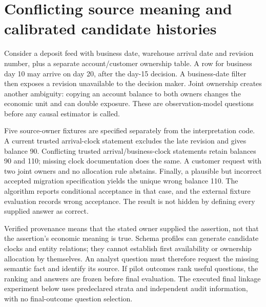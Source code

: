 \section{Conflicting source meaning and calibrated candidate histories}
\label{s6:linked-histories}
Consider a deposit feed with business date, warehouse arrival date and
revision number, plus a separate account/customer ownership table. A row
for business day 10 may arrive on day 20, after the day-15 decision. A
business-date filter then exposes a revision unavailable to the decision
maker. Joint ownership creates another ambiguity: copying an account
balance to both owners changes the economic unit and can double exposure.
These are observation-model questions before any causal estimator is called.

Five source-owner fixtures are specified separately from the interpretation
code. A current trusted arrival-clock statement excludes the late revision
and gives balance 90. Conflicting trusted arrival/business-clock statements
retain balances 90 and 110; missing clock documentation does the same. A
customer request with two joint owners and no allocation rule abstains.
Finally, a plausible but incorrect accepted migration specification yields
the unique wrong balance 110. The algorithm reports conditional acceptance
in that case, and the external fixture evaluation records wrong acceptance.
The result is not hidden by defining every supplied answer as correct.

Verified provenance means that the stated owner supplied the assertion, not
that the assertion's economic meaning is true. Schema profiles can generate
candidate clocks and entity relations; they cannot establish first
availability or ownership allocation by themselves. An analyst question
must therefore request the missing semantic fact and identify its source.
If pilot outcomes rank useful questions, the ranking and answers are frozen
before final evaluation. The executed final linkage experiment below uses
predeclared strata and independent audit information, with no final-outcome
question selection.


